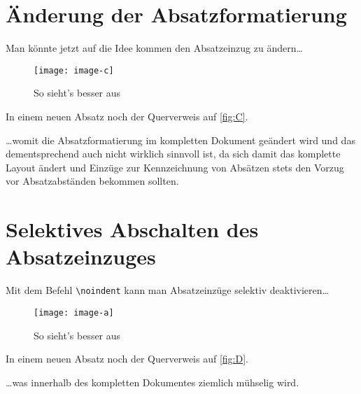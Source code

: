 \documentclass[english,ngerman]{tudscrartcl}
\begin{document}
\section{Änderung der Absatzformatierung}
Man könnte jetzt auf die Idee kommen den Absatzeinzug zu ändern\dots
%
\begin{quoting}\univrn\color{cdgrey}
\begin{Tutorial}
\blindtext

\begin{figure}[h]
\centering
\texttt{[image: image-c]}
\caption{So sieht's besser aus}
\label{fig:C}
\end{figure}

\blindtext

In einem neuen Absatz noch der Querverweis auf \autoref{fig:C}.
\end{Tutorial}
\end{quoting}
%
\enlargethispage{\baselineskip}
\dots womit die Absatzformatierung im kompletten Dokument geändert wird und das
dementsprechend auch nicht wirklich sinnvoll ist, da sich damit das komplette 
Layout ändert und Einzüge zur Kennzeichnung von Absätzen stets den Vorzug vor 
Absatzabständen bekommen sollten.

\clearpage
\section{Selektives Abschalten des Absatzeinzuges}
Mit dem Befehl \verb|\noindent| kann man Absatzeinzüge selektiv 
deaktivieren\dots
%
\begin{quoting}\univrn\color{cdgrey}
\begin{Tutorial}
\blindtext

\begin{figure}[h]
\centering
\texttt{[image: image-a]}
\caption{So sieht's besser aus}
\label{fig:D}
\end{figure}

\noindent\blindtext

In einem neuen Absatz noch der Querverweis auf \autoref{fig:D}.
\end{Tutorial}
\end{quoting}
%
\dots was innerhalb des kompletten Dokumentes ziemlich mühselig wird.

\clearpage
\end{document}
